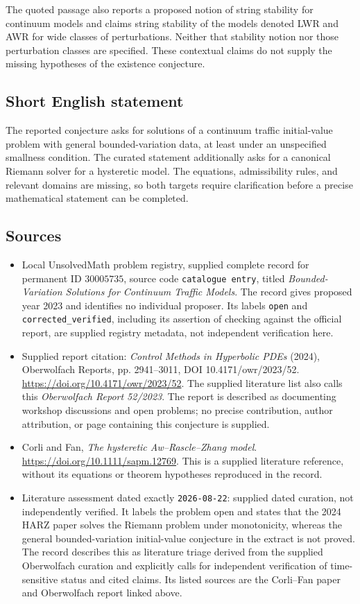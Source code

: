 \documentclass[11pt]{article}
\begin{document}
The quoted passage also reports a proposed notion of string stability for continuum models and claims string stability of the models denoted LWR and AWR for wide classes of perturbations. Neither that stability notion nor those perturbation classes are specified. These contextual claims do not supply the missing hypotheses of the existence conjecture.
\subsection{Short English statement}
The reported conjecture asks for solutions of a continuum traffic initial-value problem with general bounded-variation data, at least under an unspecified smallness condition. The curated statement additionally asks for a canonical Riemann solver for a hysteretic model. The equations, admissibility rules, and relevant domains are missing, so both targets require clarification before a precise mathematical statement can be completed.
\subsection{Sources}
\begin{itemize}
\item Local UnsolvedMath problem registry, supplied complete record for permanent ID \(30005735\), source code \texttt{catalogue entry}, titled \emph{Bounded-Variation Solutions for Continuum Traffic Models}. The record gives proposed year 2023 and identifies no individual proposer. Its labels \texttt{open} and \texttt{corrected\_verified}, including its assertion of checking against the official report, are supplied registry metadata, not independent verification here.
\item Supplied report citation: \emph{Control Methods in Hyperbolic PDEs} (2024), Oberwolfach Reports, pp. 2941--3011, DOI 10.4171/owr/2023/52. \url{https://doi.org/10.4171/owr/2023/52}. The supplied literature list also calls this \emph{Oberwolfach Report 52/2023}. The report is described as documenting workshop discussions and open problems; no precise contribution, author attribution, or page containing this conjecture is supplied.
\item Corli and Fan, \emph{The hysteretic Aw--Rascle--Zhang model}. \url{https://doi.org/10.1111/sapm.12769}. This is a supplied literature reference, without its equations or theorem hypotheses reproduced in the record.
\item Literature assessment dated exactly \texttt{2026-08-22}: supplied dated curation, not independently verified. It labels the problem open and states that the 2024 HARZ paper solves the Riemann problem under monotonicity, whereas the general bounded-variation initial-value conjecture in the extract is not proved. The record describes this as literature triage derived from the supplied Oberwolfach curation and explicitly calls for independent verification of time-sensitive status and cited claims. Its listed sources are the Corli--Fan paper and Oberwolfach report linked above.
\end{itemize}
\end{document}
